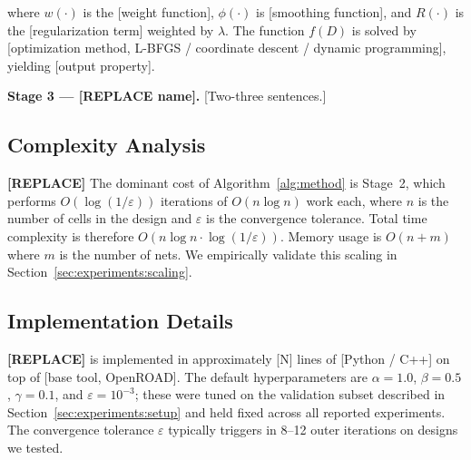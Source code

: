 \noindent where \(w(\cdot)\) is the [weight function], \(\phi(\cdot)\) is
[smoothing function], and \(R(\cdot)\) is the [regularization term]
weighted by \(\lambda\). The function \(f(D)\) is solved by [optimization
method, \eg{} L-BFGS / coordinate descent / dynamic programming], yielding
[output property].

\textbf{Stage 3 — [REPLACE name].} [Two-three sentences.]

\subsection{Complexity Analysis}
\label{sec:method:complexity}

\textbf{[REPLACE]} The dominant cost of Algorithm~\ref{alg:method} is
Stage~2, which performs \(O(\log(1/\varepsilon))\) iterations of
\(O(n \log n)\) work each, where \(n\) is the number of cells in the
design and \(\varepsilon\) is the convergence tolerance. Total time
complexity is therefore \(O(n \log n \cdot \log(1/\varepsilon))\).
Memory usage is \(O(n + m)\) where \(m\) is the number of nets.
We empirically validate this scaling in
Section~\ref{sec:experiments:scaling}.

\subsection{Implementation Details}
\label{sec:method:impl}

\textbf{[REPLACE]} \method{} is implemented in approximately [N] lines of
[Python / C++] on top of [base tool, \eg{} OpenROAD]. The default
hyperparameters are \(\alpha = 1.0\), \(\beta = 0.5\), \(\gamma = 0.1\),
and \(\varepsilon = 10^{-3}\); these were tuned on the validation subset
described in Section~\ref{sec:experiments:setup} and held fixed across
all reported experiments. The convergence tolerance \(\varepsilon\)
typically triggers in 8--12 outer iterations on designs we tested.
